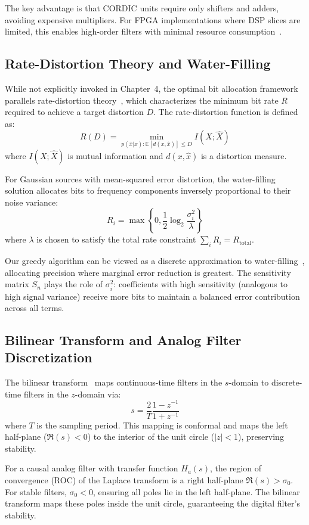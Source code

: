 The key advantage is that CORDIC units require only shifters and adders, avoiding expensive multipliers. For FPGA implementations where DSP slices are limited, this enables high-order filters with minimal resource consumption~\cite{Andraka1998}.

\subsection{Rate-Distortion Theory and Water-Filling}

While not explicitly invoked in Chapter~4, the optimal bit allocation framework parallels rate-distortion theory~\cite{CoverThomas2006}, which characterizes the minimum bit rate $R$ required to achieve a target distortion $D$. The rate-distortion function is defined as:
\[
R(D) = \min_{p(\hat{x}|x): \mathbb{E}[d(x,\hat{x})] \leq D} I(X; \hat{X})
\]
where $I(X; \hat{X})$ is mutual information and $d(x, \hat{x})$ is a distortion measure.

For Gaussian sources with mean-squared error distortion, the water-filling solution allocates bits to frequency components inversely proportional to their noise variance:
\[
R_i = \max\left\{0, \frac{1}{2}\log_2\frac{\sigma_i^2}{\lambda}\right\}
\]
where $\lambda$ is chosen to satisfy the total rate constraint $\sum_i R_i = R_{\text{total}}$.

Our greedy algorithm can be viewed as a discrete approximation to water-filling~\cite{Kailath2000}, allocating precision where marginal error reduction is greatest. The sensitivity matrix $S_n$ plays the role of $\sigma_i^2$: coefficients with high sensitivity (analogous to high signal variance) receive more bits to maintain a balanced error contribution across all terms.

\subsection{Bilinear Transform and Analog Filter Discretization}

The bilinear transform~\cite{OppenheimDSP,Kailath2000} maps continuous-time filters in the $s$-domain to discrete-time filters in the $z$-domain via:
\[
s = \frac{2}{T}\frac{1-z^{-1}}{1+z^{-1}}
\]
where $T$ is the sampling period. This mapping is conformal and maps the left half-plane ($\Re(s) < 0$) to the interior of the unit circle ($|z| < 1$), preserving stability.

For a causal analog filter with transfer function $H_a(s)$, the region of convergence (ROC) of the Laplace transform is a right half-plane $\Re(s) > \sigma_0$. For stable filters, $\sigma_0 < 0$, ensuring all poles lie in the left half-plane. The bilinear transform maps these poles inside the unit circle, guaranteeing the digital filter's stability.

